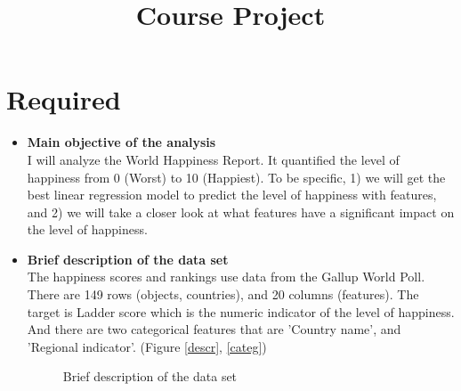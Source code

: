 \documentclass[12pt]{article}
\title{Course Project}
\begin{document}
\maketitle

\section{Required}

\begin{itemize}
\item \textbf{Main objective of the analysis} \\
I will analyze the World Happiness Report. 
It quantified the level of happiness from 0 (Worst) to 10 (Happiest). To be specific, 1) we will get the best linear regression model to predict the level of happiness with features, and 2) we will take a closer look at what features have a significant impact on the level of happiness.

\item \textbf{Brief description of the data set} \\
The happiness scores and rankings use data from the Gallup World Poll. There are 149 rows (objects, countries), and 20 columns (features). The target is Ladder score which is the numeric indicator of the level of happiness. And there are two categorical features that are 'Country name', and 'Regional indicator'. (Figure \ref{descr}, \ref{categ})



\begin{figure}[hbt!]
    \centering
    \hfill
    \caption{Brief description of the data set}
\end{figure}


\end{itemize}
\end{document}
